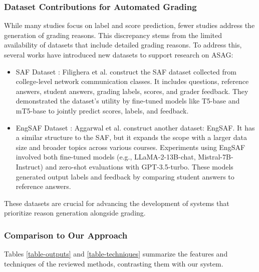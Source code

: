 \subsubsection{Dataset Contributions for Automated Grading}
While many studies focus on label and score prediction, fewer studies address the generation of grading reasons.
This discrepancy stems from the limited availability of datasets that include detailed grading reasons.
To address this, several works have introduced new datasets to support research on ASAG:

\begin{itemize}
    \item SAF Dataset \citep{safdataset}: Filighera et al. construct the SAF dataset collected from college-level network communication classes. It includes questions, reference answers, student answers, grading labels, scores, and grader feedback. They demonstrated the dataset's utility by fine-tuned models like T5-base and mT5-base to jointly predict scores, labels, and feedback.

    \item EngSAF Dataset \citep{iunderstandwhy}: Aggarwal et al. construct another dataset: EngSAF. It has a similar structure to the SAF, but it expands the scope with a larger data size and broader topics across various courses. Experiments using EngSAF involved both fine-tuned models (e.g., LLaMA-2-13B-chat, Mistral-7B-Instruct) and zero-shot evaluations with GPT-3.5-turbo. These models generated output labels and feedback by comparing student answers to reference answers.
\end{itemize}

These datasets are crucial for advancing the development of systems that prioritize reason generation alongside grading.

\subsubsection{Comparison to Our Approach}

Tables \ref{table-outputs} and \ref{table-techniques} summarize the features and techniques of the reviewed methods, contrasting them with our system.

